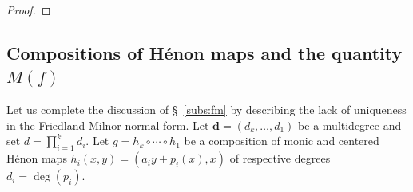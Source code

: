 \documentclass[oneside, 12pt]{amsart}
\newcommand{\abs}[1]{\left\vert#1\right\vert}
\theoremstyle{plain}
\theoremstyle{definition}
\numberwithin{equation}{section}       %
\numberwithin{equation}{section}       %
\begin{document}
\begin{proof}
%
%
\end{proof}




\subsection{Compositions of Hénon maps and the quantity $M(f)$}\label{subs:M_for_loxodromic} 
Let us complete the discussion of \S~\ref{subs:fm}  by describing the lack of uniqueness in the Friedland-Milnor normal form. 
Let $\mathbf d =(d_k, \ldots, d_1)$ be a multidegree and set $d = \prod_{i=1}^k d_i$.
Let $g = h_k\circ \cdots \circ h_1$ be a composition of monic and centered Hénon maps $h_i(x,y) = (a_i y+ p_i(x), x)$ 
of respective degrees  $d_i=\deg(p_i)$.  
\end{document}
